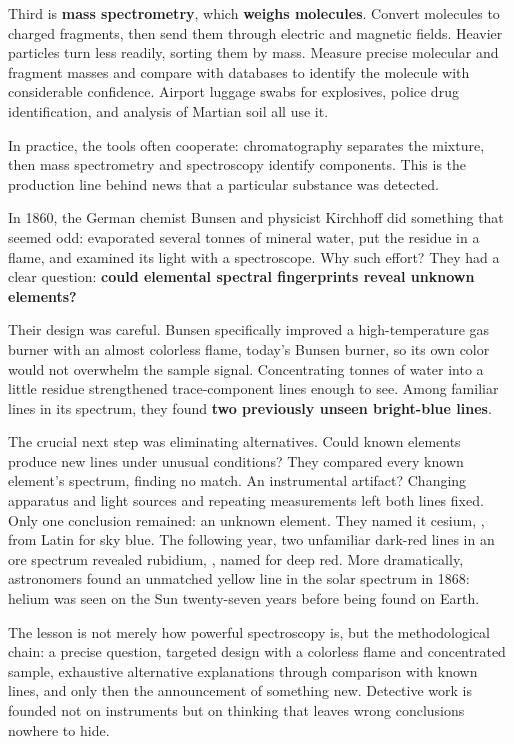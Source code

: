 Third is \textbf{mass spectrometry}, which \textbf{weighs molecules}. Convert molecules to charged fragments, then send them through electric and magnetic fields. Heavier particles turn less readily, sorting them by mass. Measure precise molecular and fragment masses and compare with databases to identify the molecule with considerable confidence. Airport luggage swabs for explosives, police drug identification, and analysis of Martian soil all use it.

In practice, the tools often cooperate: chromatography separates the mixture, then mass spectrometry and spectroscopy identify components. This is the production line behind news that a particular substance was detected.

\begin{zhengju}
In 1860, the German chemist Bunsen and physicist Kirchhoff did something that seemed odd: evaporated several tonnes of mineral water, put the residue in a flame, and examined its light with a spectroscope. Why such effort? They had a clear question: \textbf{could elemental spectral fingerprints reveal unknown elements?}

Their design was careful. Bunsen specifically improved a high-temperature gas burner with an almost colorless flame, today's Bunsen burner, so its own color would not overwhelm the sample signal. Concentrating tonnes of water into a little residue strengthened trace-component lines enough to see. Among familiar lines in its spectrum, they found \textbf{two previously unseen bright-blue lines}.

The crucial next step was eliminating alternatives. Could known elements produce new lines under unusual conditions? They compared every known element's spectrum, finding no match. An instrumental artifact? Changing apparatus and light sources and repeating measurements left both lines fixed. Only one conclusion remained: an unknown element. They named it cesium, , from Latin for sky blue. The following year, two unfamiliar dark-red lines in an ore spectrum revealed rubidium, , named for deep red. More dramatically, astronomers found an unmatched yellow line in the solar spectrum in 1868: helium was seen on the Sun twenty-seven years before being found on Earth.

The lesson is not merely how powerful spectroscopy is, but the methodological chain: a precise question, targeted design with a colorless flame and concentrated sample, exhaustive alternative explanations through comparison with known lines, and only then the announcement of something new. Detective work is founded not on instruments but on thinking that leaves wrong conclusions nowhere to hide.
\end{zhengju}


